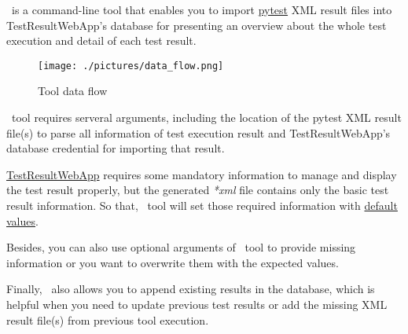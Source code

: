 



\pkg\ is a command-line tool that enables you to import
\href{https://docs.pytest.org/}{pytest} XML result
files into TestResultWebApp's database for presenting an overview about the
whole test execution and detail of each test result.

\begin{figure}[h!]
   \texttt{[image: ./pictures/data\_flow.png]}
   \caption{Tool data flow}
\end{figure}

\pkg\ tool requires serveral arguments, including the location of the pytest
XML result file(s) to parse all information of test execution result and
TestResultWebApp's database credential for importing that result.

\href{https://github.com/test-fullautomation/testresultwebapp}{TestResultWebApp}
requires some mandatory information to manage and display the test result
properly, but the generated \emph{*xml} file contains only the basic test result
information. So that, \pkg\ tool will set those required information with
\hyperref[default-values]{default values}.

Besides, you can also use optional arguments of \pkg\ tool to provide missing
information or you want to overwrite them with the expected values.

Finally, \pkg\ also allows you to append existing results in the database, which
is helpful when you need to update previous test results or add the missing
XML result file(s) from previous tool execution.
